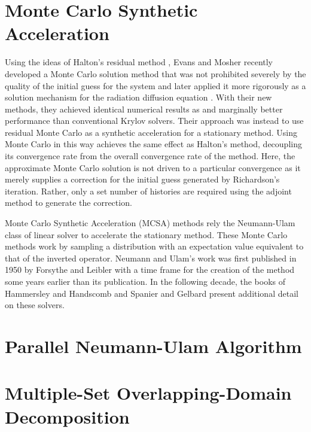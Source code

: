 \documentclass{snamc2013}
\begin{document}
\section{Monte Carlo Synthetic Acceleration}

Using the ideas of Halton's residual method
\cite{halton_sequential_1994}, Evans and Mosher recently developed a
Monte Carlo solution method that was not prohibited severely by the
quality of the initial guess for the system \cite{evans_monte_2009}
and later applied it more rigorously as a solution mechanism for the
radiation diffusion equation \cite{evans_monte_2012}. With their new
methods, they achieved identical numerical results as and marginally
better performance than conventional Krylov solvers. Their approach
was instead to use residual Monte Carlo as a synthetic acceleration
for a stationary method. Using Monte Carlo in this way achieves the
same effect as Halton's method, decoupling its convergence rate from
the overall convergence rate of the method. Here, the approximate
Monte Carlo solution is not driven to a particular convergence as it
merely supplies a correction for the initial guess generated by
Richardson's iteration. Rather, only a set number of histories are
required using the adjoint method to generate the correction.

Monte Carlo Synthetic Acceleration (MCSA) methods rely the
Neumann-Ulam class of linear solver to accelerate the stationary
method. These Monte Carlo methods work by sampling a distribution with
an expectation value equivalent to that of the inverted
operator. Neumann and Ulam's work was first published in 1950 by
Forsythe and Leibler \cite{forsythe_matrix_1950} with a time frame for
the creation of the method some years earlier than its publication. In
the following decade, the books of Hammersley and Handscomb
\cite{hammersley_monte_1964} and Spanier and Gelbard
\cite{spanier_monte_1969} present additional detail on these solvers.

\section{Parallel Neumann-Ulam Algorithm}

\section{Multiple-Set Overlapping-Domain Decomposition}
\end{document}
